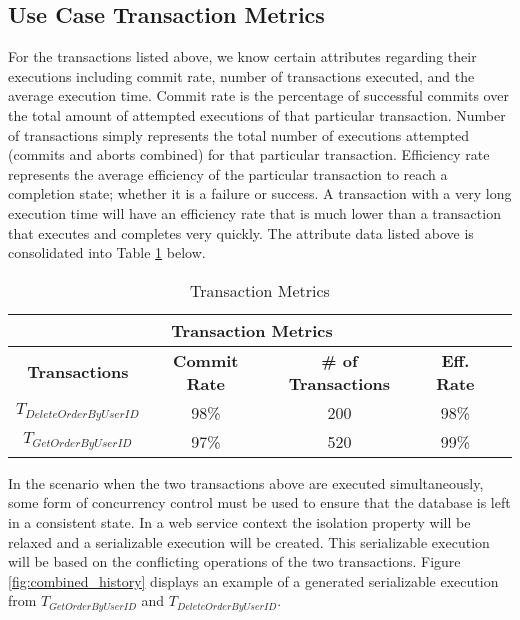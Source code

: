 \documentclass[conference]{IEEEtran}
\begin{document}
\subsection{Use Case Transaction Metrics}

For the transactions listed above, we know certain attributes regarding their executions including commit rate, number of transactions executed, and the average execution time. Commit rate is the percentage of successful commits over the total amount of attempted executions of that particular transaction. Number of transactions simply represents the total number of executions attempted (commits and aborts combined) for that particular transaction. Efficiency rate represents the average efficiency of the particular transaction to reach a completion state; whether it is a failure or success. A transaction with a very long execution time will have an efficiency rate that is much lower than a transaction that executes and completes very quickly. The attribute data listed above is consolidated into Table \ref{tbl:trans_metrics} below. 
\\
\begin{table}[h]
\captionsetup{justification=centering}
\centering
\begin{tabular}{|c|c|c|c|c|}
\hline
\multicolumn{4}{|c|}{\cellcolor[HTML]{EFEFEF}\textbf{Transaction Metrics}}                                                   \\ \hline
\textbf{Transactions} & \textbf{Commit Rate} & \textbf{\# of Transactions} & {\color[HTML]{000000} \textbf{Eff. Rate}} \\ \hline
$T_{DeleteOrderByUserID}$         & 98\%                  & 200                         & 98\%                                          \\ \hline
$T_{GetOrderByUserID}$          & 97\%                     & 520                           & 99\%                                              \\ \hline
\end{tabular}

\caption{Transaction Metrics} %
\label{tbl:trans_metrics} %

\end{table}

In the scenario when the two transactions above are executed simultaneously, some form of concurrency control must be used to ensure that the database is left in a consistent state. In a web service context the isolation property will be relaxed and a serializable execution will be created. This serializable execution will be based on the conflicting operations of the two transactions. Figure \ref{fig:combined_history} displays an example of a generated serializable execution from $T_{GetOrderByUserID}$ and $T_{DeleteOrderByUserID}$.
\end{document}
